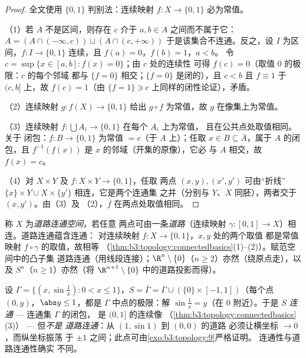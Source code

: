 \begin{proof}
全文使用 $\{0,1\}$ 判别法：连续映射 $f \colon X \to
\{0,1\}$ 必为常值。

（1）若 $A$ 不是区间，则存在 $c$ 介于 $a, b \in A$ 之间而不属于它：
$A = (A \cap (-\infty, c)) \sqcup (A \cap (c, +\infty))$
于是该集合不连通。反之，设 $I$ 为区间，$f \colon I
\to \{0,1\}$ 连续，且 $f(a) = 0$，$f(b) = 1$，$a < b$。
令 $c = \sup\{x \in [a,b] : f(x) = 0\}$；由 $c$ 处的连续性
可得 $f(c) = 0$（取值 $0$ 的极限：$c$ 的每个邻域
都与 $\{f = 0\}$ 相交；$\{f=0\}$ 是闭的），且 $c < b$
且 $f \equiv 1$ 于 $(c, b]$ 上，故 $f(c) = 1$（由
$\{f = 1\} \ni c$ 上同样的闭性论证），矛盾。

（2）连续映射 $g \colon f(X) \to \{0,1\}$ 给出 $g \circ f$
为常值，故 $g$ 在像集上为常值。

（3）连续映射 $f\colon \bigcup A_i \to \{0,1\}$ 在每个 $A_i$ 上为常值，
且在公共点处取值相同。关于
闭包：$f \colon B \to \{0,1\}$ 为常值 $= c$（于 $A$ 上）；任取
$x \in B \subseteq \bar A$，属于 $A$ 的闭包，且 $f^{-1}
(f(x))$ 是 $x$ 的邻域（开集的原像），它必
与 $A$ 相交，故 $f(x) = c$。

（4）对 $X \times Y$ 及 $f\colon X\times Y \to \{0,1\}$，任取
两点 $(x,y), (x',y')$ 可由“折线”
$\{x\}\times Y \cup X \times \{y'\}$ 相连，它是两个连通集
之并（分别与 $Y$、$X$ 同胚），两者交于 $(x, y')$。由（3）及
（2），$f$ 在两点处取值相同。
\end{proof}

\begin{definition}\label{def:b3:topology:pathconnected}
称 $X$ 为\emph{道路连通空间}，若任意
两点可由一条\emph{道路}（连续映射 $\gamma
\colon [0,1] \to X$）相连。道路连通蕴含连通：
对连续映射 $f \colon X \to \{0,1\}$，$x, y$ 处的两个取值
都是常值映射 $f\circ\gamma$ 的取值，故相等
（\cref{thm:b3:topology:connectedbasics}(1)--(2)）。赋范空间中的凸子集
道路连通（用线段连接）；$\R^n
\setminus \{0\}$（$n \geq 2$）亦然（绕原点走），以及
$S^n$（$n \geq 1$）亦然（将 $\R^{n+1}\setminus
\{0\}$ 中的道路投影而得）。
\end{definition}

\begin{example}[拓扑学家的正弦曲线]
\label{ex:b3:topology:sinecurve}
设 $\Gamma = \{(x, \sin\frac1x) : 0 < x \leq 1\}$，$S =
\bar\Gamma = \Gamma \cup (\{0\}\times[-1,1])$（每个点 $(0,
y)$，$\abs y \leq 1$，都是 $\Gamma$ 中点的极限：解
$\sin\frac1x = y$（在 $0$ 附近）。于是 $S$
\emph{连通} --- 连通集 $\Gamma$ 的闭包，
是 $(0, 1]$ 的连续像
（\cref{thm:b3:topology:connectedbasics}(3)） --- 但\emph{不是
道路连通}：从 $(1, \sin 1)$ 到 $(0,0)$ 的道路
必须让横坐标 $\to 0$，而纵坐标振荡
于 $\pm1$ 之间；此点可由\cref{exo:b3:topology:9}严格证明。
连通性与道路连通性确实
不同。
\end{example}

